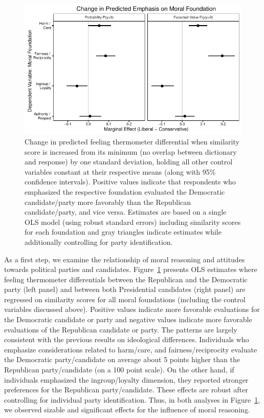 \documentclass[12pt]{article}
\begin{document}
\begin{figure}[ht]\centering
\includegraphics{../calc/fig/ols_feel.pdf}
\caption{Change in predicted feeling thermometer differential when similarity score is increased from its minimum (no overlap between dictionary and response) by one standard deviation, holding all other control variables constant at their respective means (along with 95\% confidence intervals). Positive values indicate that respondents who emphasized the respective foundation evaluated the Democratic candidate/party more favorably than the Republican candidate/party, and vice versa. Estimates are based on a single OLS model (using robust standard errors) including similarity scores for each foundation and gray triangles indicate estimates while additionally controlling for party identification. %
}\label{fig:ols_feel}
\end{figure}

As a first step, we examine the relationship of moral reasoning and attitudes towards political parties and candidates. Figure~\ref{fig:ols_feel} presents OLS estimates where feeling thermometer differentials between the Republican and the Democratic party (left panel) and between both Presidential candidates (right panel) are regressed on similarity scores for all moral foundations (including the control variables discussed above). Positive values indicate more favorable evaluations for the Democratic candidate or party and negative values indicate more favorable evaluations of the Republican candidate or party. The patterns are largely consistent with the previous results on ideological differences. Individuals who emphasize considerations related to harm/care, and fairness/reciprocity evaluate the Democratic party/candidate on average about 5 points higher than the Republican party/candidate (on a 100 point scale). On the other hand, if individuals emphasized the ingroup/loyalty dimension, they reported stronger preferences for the Republican party/candidate. These effects are robust after controlling for individual party identification. Thus, in both analyses in Figure~\ref{fig:ols_feel}, we observed sizable and significant effects for the influence of moral reasoning.
\end{document}
